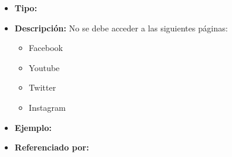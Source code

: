     \begin{itemize}
      \item \textbf{Tipo:}  
      \item \textbf{Descripción:} No se debe acceder a las siguientes páginas:
        \begin{itemize}
            \item Facebook
            \item Youtube
            \item Twitter
            \item Instagram 
        \end{itemize} 
      \item \textbf{Ejemplo:}
      \item \textbf{Referenciado por:}  \\
    \end{itemize}

